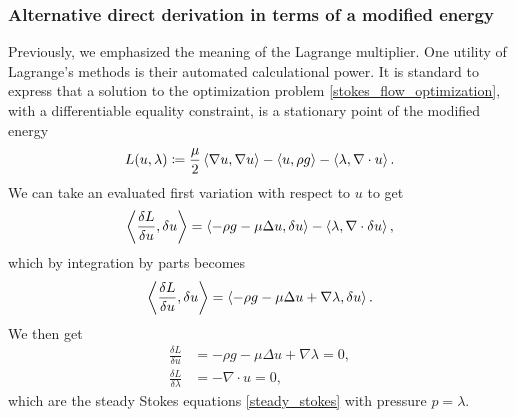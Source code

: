 \subsubsection{Alternative direct derivation in terms of a modified energy}
Previously, we emphasized the meaning of the Lagrange multiplier. One utility of Lagrange's methods is their automated calculational power.
It is standard to express that a solution to the optimization
problem \eqref{stokes_flow_optimization}, with a differentiable equality constraint, is a stationary point of the modified energy
\begin{equation}\label{stokes_flow_modified_energy}
    L(u, \lambda) \coloneqq \frac{\mu}{2} \left<\nabla u, \nabla u\right> - \left<u, \rho g\right> - \left<\lambda, \nabla\cdot u\right>.\\
\end{equation}
We can take an evaluated first variation with respect to $u$ to get
\begin{align*}
    \left<\frac{\delta L}{\delta u}, \delta u\right> = \left<-\rho g - \mu\Delta u, \delta u\right> - \left<\lambda, \nabla\cdot\delta u\right>,
\end{align*}
which by integration by parts becomes
\begin{equation}
    \left<\frac{\delta L}{\delta u}, \delta u\right> = \left<-\rho g - \mu\Delta u + \nabla \lambda, \delta u\right>.
\end{equation}
We then get
\begin{equation}
\begin{split}
    \frac{\delta L}{\delta u} &= -\rho g - \mu\Delta u + \nabla \lambda = 0,\\
    \frac{\delta L}{\delta \lambda} &= -\nabla\cdot u = 0,
\end{split}
\end{equation}
which are the steady Stokes equations \eqref{steady_stokes} with pressure $p = \lambda$.

% 

